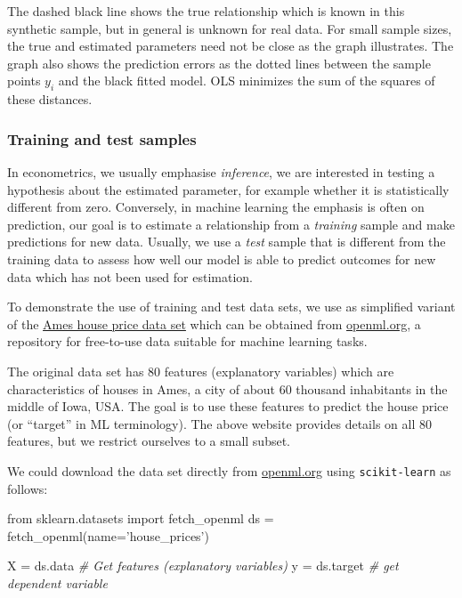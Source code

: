 \documentclass{scrartcl}
\newenvironment{Shaded}{}{}
\newcommand{\StringTok}[1]{\textcolor[rgb]{0.25,0.44,0.63}{{#1}}}
\newcommand{\CommentTok}[1]{\textcolor[rgb]{0.38,0.63,0.69}{\textit{{#1}}}}
\newcommand{\NormalTok}[1]{{#1}}
\newcommand{\ImportTok}[1]{{#1}}
\newcommand{\OperatorTok}[1]{\textcolor[rgb]{0.40,0.40,0.40}{{#1}}}
\begin{document}
    \begin{center}
    \end{center}
    
    The dashed black line shows the true relationship which is known in this
synthetic sample, but in general is unknown for real data. For small
sample sizes, the true and estimated parameters need not be close as the
graph illustrates. The graph also shows the prediction errors as the
dotted lines between the sample points \(y_i\) and the black fitted
model. OLS minimizes the sum of the squares of these distances.

    \hypertarget{training-and-test-samples}{%
\subsubsection{Training and test
samples}\label{training-and-test-samples}}

In econometrics, we usually emphasise \emph{inference}, \ie we are
interested in testing a hypothesis about the estimated parameter, for
example whether it is statistically different from zero. Conversely, in
machine learning the emphasis is often on prediction, \ie our goal is
to estimate a relationship from a \emph{training} sample and make
predictions for new data. Usually, we use a \emph{test} sample that is
different from the training data to assess how well our model is able to
predict outcomes for new data which has not been used for estimation.

    To demonstrate the use of training and test data sets, we use as
simplified variant of the \href{https://www.openml.org/d/42165}{Ames
house price data set} which can be obtained from
\href{https://www.openml.org}{openml.org}, a repository for free-to-use
data suitable for machine learning tasks.

The original data set has 80 features (explanatory variables) which are
characteristics of houses in Ames, a city of about 60 thousand
inhabitants in the middle of Iowa, USA. The goal is to use these
features to predict the house price (or ``target'' in ML terminology).
The above website provides details on all 80 features, but we restrict
ourselves to a small subset.

We could download the data set directly from
\href{https://www.openml.org}{openml.org} using \texttt{scikit-learn} as
follows:

\begin{Shaded}
\begin{Highlighting}[]
    \ImportTok{from}\NormalTok{ sklearn.datasets }\ImportTok{import}\NormalTok{ fetch_openml}
\NormalTok{    ds }\OperatorTok{=}\NormalTok{ fetch_openml(name}\OperatorTok{=}\StringTok{'house_prices'}\NormalTok{)}

\NormalTok{    X }\OperatorTok{=}\NormalTok{ ds.data         }\CommentTok{# Get features (explanatory variables)}
\NormalTok{    y }\OperatorTok{=}\NormalTok{ ds.target       }\CommentTok{# get dependent variable}
\end{Highlighting}
\end{Shaded}
\end{document}
